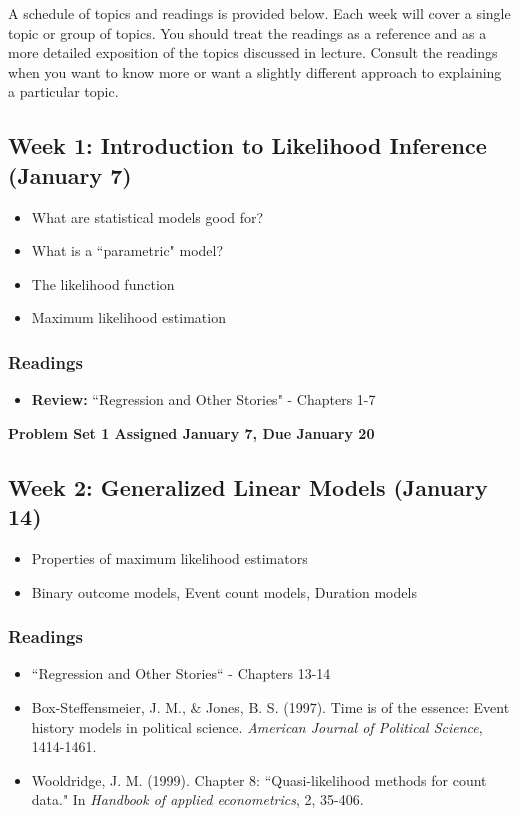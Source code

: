 \documentclass[11pt, article, oneside]{memoir}
\theoremstyle{Assumption}
\begin{document}
A schedule of topics and readings is provided below. Each week will cover a single topic or group of topics. You should treat the readings as a reference and as a more detailed exposition of the topics discussed in lecture. Consult the readings when you want to know more or want a slightly different approach to explaining a particular topic.

\subsection{Week 1: Introduction to Likelihood Inference (January 7)}

\begin{itemize}
  \item What are statistical models good for?
  \item What is a ``parametric" model?
  \item The likelihood function 
  \item Maximum likelihood estimation
\end{itemize}

\subsubsection*{Readings}

\begin{itemize}
\item \textbf{Review:} ``Regression and Other Stories" - Chapters 1-7
\end{itemize}

\textbf{Problem Set 1 Assigned January 7, Due January 20}

\subsection{Week 2: Generalized Linear Models (January 14)}

\begin{itemize}
\item Properties of maximum likelihood estimators
\item Binary outcome models, Event count models, Duration models
\end{itemize}

\subsubsection*{Readings}

\begin{itemize}
\item ``Regression and Other Stories`` - Chapters 13-14
\item Box-Steffensmeier, J. M., \& Jones, B. S. (1997). Time is of the essence: Event history models in political science. \textit{American Journal of Political Science}, 1414-1461.
\item Wooldridge, J. M. (1999). Chapter 8: ``Quasi-likelihood methods for count data." In \textit{Handbook of applied econometrics}, 2, 35-406.
\end{itemize}
\end{document}
